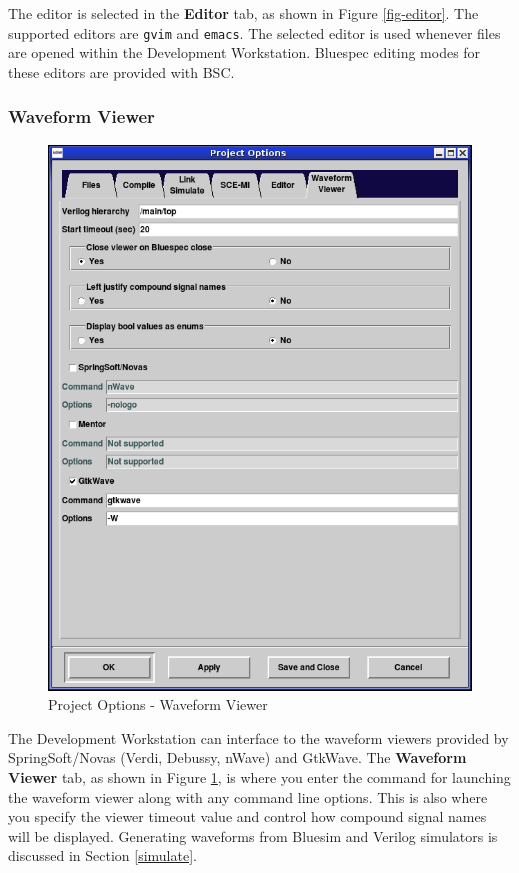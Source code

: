 \documentclass{article}
\newcommand{\te}[1]{\texttt{#1}}
\begin{document}
The editor is selected in the {\bf Editor} tab, as shown in Figure
\ref{fig-editor}.   The supported editors are  \te{gvim}  and
\te{emacs}.   The selected
editor is used whenever files are opened within the
Development Workstation. Bluespec editing modes for these editors are
provided with BSC.


\subsubsection{Waveform Viewer}
\label{options-waveform}


\begin{figure}[ht]
\begin{center}
\includegraphics[width = 3 in]{figures/options-wave}
\caption{Project Options - Waveform Viewer}
\label{fig-wave}
\end{center}
\end{figure}

The Development Workstation can interface to the waveform viewers
provided by SpringSoft/Novas (Verdi, Debussy, nWave) and GtkWave.  %
The {\bf Waveform Viewer} tab, as shown in
Figure \ref{fig-wave},   is where you enter the command for
   launching the waveform viewer along with any
 command line options.  This is  also where you  specify the viewer timeout
value and control how compound signal names will be displayed.
 Generating waveforms from Bluesim and Verilog
simulators is discussed in  Section \ref{simulate}.
\end{document}
